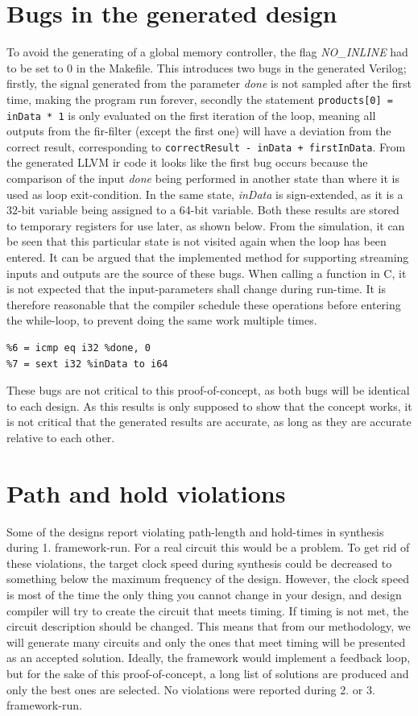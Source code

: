 \section{\label{sec:designbugs}Bugs in the generated design}
To avoid the generating of a global memory controller, the flag \textit{NO\_INLINE} had to be set to 0 in the Makefile. This introduces two bugs in the generated Verilog; firstly, the signal generated from the parameter \textit{done} is not sampled after the first time, making the program run forever, secondly the statement \verb!products[0] = inData * 1! is only evaluated on the first iteration of the loop, meaning all outputs from the \gls{fir}-filter (except the first one) will have a deviation from the correct result, corresponding to \verb!correctResult - inData + firstInData!. From the generated LLVM \gls{ir} code it looks like the first bug occurs because the comparison of the input \textit{done} being performed in another state than where it is used as loop exit-condition. In the same state, \textit{inData} is sign-extended, as it is a 32-bit variable being assigned to a 64-bit variable. Both these results are stored to temporary registers for use later, as shown below. From the simulation, it can be seen that this particular state is not visited again when the loop has been entered. It can be argued that the implemented method for supporting streaming inputs and outputs are the source of these bugs. When calling a function in C, it is not expected that the input-parameters shall change during run-time. It is therefore reasonable that the compiler schedule these operations before entering the while-loop, to prevent doing the same work multiple times.
\lstset{language=llvm,style=LLVMstyle}
\begin{lstlisting}
%6 = icmp eq i32 %done, 0
%7 = sext i32 %inData to i64
\end{lstlisting}
These bugs are not critical to this proof-of-concept, as both bugs will be identical to each design. As this results is only supposed to show that the concept works, it is not critical that the generated results are accurate, as long as they are accurate relative to each other.
\section{Path and hold violations}
Some of the designs report violating path-length and hold-times in synthesis during 1. framework-run. For a real circuit this would be a problem. To get rid of these violations, the target clock speed during synthesis could be decreased to something below the maximum frequency of the design. However, the clock speed is most of the time the only thing you cannot change in your design, and design compiler will try to create the circuit that meets timing. If timing is not met, the circuit description should be changed. This means that from our methodology, we will generate many circuits and only the ones that meet timing will be presented as an accepted solution. Ideally, the framework would implement a feedback loop, but for the sake of this proof-of-concept, a long list of solutions are produced and only the best ones are selected. No violations were reported during 2. or 3. framework-run.

